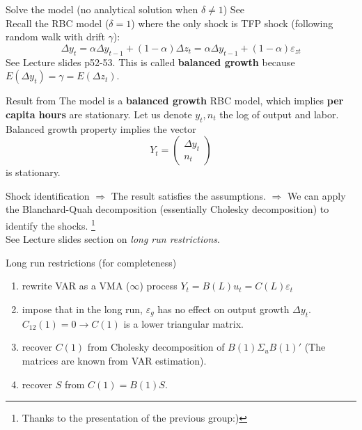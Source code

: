 \documentclass[10pt]{beamer}
\begin{document}
\begin{frame}{Solve the model (no analytical solution when $\delta \neq 1$)}
    See \cite{christiano_eichenbaum_2020}\\
    Recall the RBC model ($\delta=1$) where the only shock is TFP shock (following random walk with drift $\gamma$):
    \begin{equation*}
        \Delta y_t = \alpha \Delta y_{t-1} + (1-\alpha) \Delta z_t = \alpha \Delta y_{t-1} + (1-\alpha) \varepsilon_{z t}
    \end{equation*}
    See Lecture slides p52-53. This is called \textbf{balanced growth} because $E(\Delta y_t) = \gamma = E(\Delta z_t)$.
    \begin{alertblock}{Result from \cite{christiano_eichenbaum_2020}}
        The model is a \textbf{balanced growth} RBC model, which implies \textbf{per capita hours} are stationary. Let us denote $y_t, n_t$ the log of output and labor. Balanced growth property implies the vector
        \begin{equation*}
            Y_t = \begin{pmatrix}
                \Delta y_t \\ n_t
            \end{pmatrix}
        \end{equation*} is stationary.
    \end{alertblock}
\end{frame}
\begin{frame}{Shock identification}
    $\Longrightarrow$ The result satisfies the \cite{blanchard_quah_1988} assumptions.
    $\Longrightarrow$ We can apply the Blanchard-Quah decomposition (essentially Cholesky decomposition) to identify the shocks. \footnote{Thanks to the presentation of the previous group:)}\\
    See Lecture slides section on \emph{long run restrictions}.
\end{frame}
\begin{frame}{Long run restrictions (for completeness)}
    \begin{enumerate}
        \item rewrite VAR as a VMA ($\infty$) process  $Y_t=B(L)u_t=C(L)\varepsilon_t$
        \item impose that in the long run, $\varepsilon_g$ has no effect on output growth
              $\Delta y_t$. $C_{12}(1)=0\rightarrow C(1)$ is a lower triangular matrix.
        \item recover $C(1)$ from Cholesky decomposition of $B(1)\Sigma_u B(1)'$ (The matrices are known from
              VAR estimation).
        \item recover $S$ from $C(1)=B(1)S$.
    \end{enumerate}
\end{frame}
\end{document}
